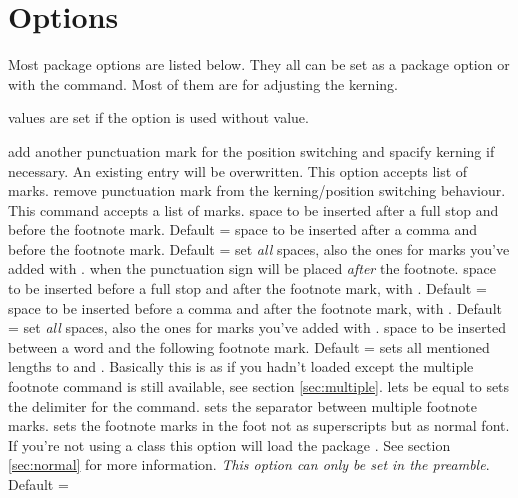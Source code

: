 \documentclass[toc=index,toc=bib]{cnpkgdoc}
\begin{document}
\section{Options}\label{sec:options}
Most package options are listed below. They all can be set as a package option or
with the  command. Most of them are for adjusting the kerning.

 values are set if the option is used without value.
\begin{beschreibung}
  add another punctuation
 mark for the position switching and spacify kerning if necessary. An existing entry
 will be overwritten. This option accepts list of marks.
  remove punctuation mark from the kerning/position
 switching behaviour. This command accepts a list of marks.
  space to be inserted after a full stop and before
 the footnote mark. Default = \code{-.06em}
  space to be inserted after a comma and before
 the footnote mark. Default = \code{-.06em}
  set \emph{all} spaces, \ie also the ones for
 marks you've added with .
  when  the punctuation sign
 will be placed \emph{after} the footnote.
  space to be inserted before a full stop and after
 the footnote mark, \ie with . Default = \code{-.15em}
  space to be inserted before a comma and after
 the footnote mark, \ie with . Default = \code{-.15em}
  set \emph{all} spaces, \ie also the ones for
 marks you've added with .
  space to be inserted between a word and
 the following footnote mark. Default = \code{.06em}
  sets all mentioned lengths to  and
 . Basically this is as if you hadn't loaded \fnpct except
 the multiple footnote command is still available, see section \ref{sec:multiple}.
  lets  be equal to
  sets the delimiter for the 
 command.
  sets the separator between multiple footnote
 marks.
  sets the footnote marks in the foot
 not as superscripts but as normal font. If you're not using a 
 class this option will load the package . See section \ref{sec:normal}
 for more information. \emph{This option can only be set in the preamble}. Default
 = 
\end{beschreibung}
\end{document}

